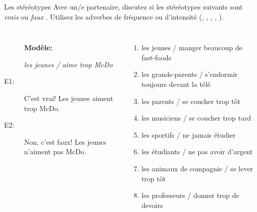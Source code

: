 \begin{frame}{Les stéréotypes }
  Avec un/e partenaire, discutez si les stéréotypes suivants sont \emph{vrais}  ou \emph{faux} .
  Utilisez les adverbes de fréquence ou d'intensité (, , , , ). \\
  \begin{columns}[t]
      \scriptsize
      \begin{description}
        \item[] \textbf{Modèle:}
        \item[] \emph{les jeunes / aime trop McDo}
        \item[E1:] C'est vrai! Les jeunes aiment trop McDo.
        \item[] 
        \item[E2:] Non, c'est faux! Les jeunes n'aiment pas McDo.
        \item[] 
      \end{description}
      \scriptsize
      \begin{enumerate}
        \item les jeunes / manger beaucoup de fast-foods
        \item les grands-parents / s'endormir toujours devant la télé
        \item les parents / se coucher trop tôt
        \item les musiciens / se coucher trop tard
        \item les sportifs / ne jamais étudier
        \item les étudiants / ne pas avoir d'argent
        \item les animaux de compagnie / se lever trop tôt
        \item les professeurs / donner trop de devoirs
      \end{enumerate}
  \end{columns}
\end{frame}